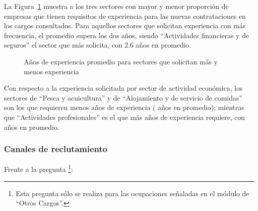 \documentclass[
  11pt,
]{article}
\begin{document}
La Figura~\ref{fig-top_and_bottom} muestra a los tres sectores con mayor
y menor proporción de empresas que tienen requisitos de experiencia para
las nuevas contrataciones en los cargos consultados. Para aquellos
sectores que solicitan experiencia con más frecuencia, el promedio
supera los dos años, siendo ``Actividades financieras y de seguros'' el
sector que más solicita, con 2.6 años en promedio.

\begin{figure}[H]

\caption{\label{fig-top_and_bottom}Años de experiencia promedio para
sectores que solicitan más y menos experiencia}


\end{figure}%

Con respecto a la experiencia solicitada por sector de actividad
económica, los sectores de ``Pesca y acuicultura'' y de ``Alojamiento y
de servicio de comidas'' son los que requieren menos años de experiencia
( años en promedio); mientras que ``Actividades
profesionales'' es el que más años de experiencia requiere, con
 años en promedio.

\subsubsection{Canales de reclutamiento}\label{canales-de-reclutamiento}

Frente a la pregunta \footnote{Esta pregunta sólo se realiza para las
  ocupaciones señaladas en el módulo de ``Otros Cargos''.}:
\end{document}
